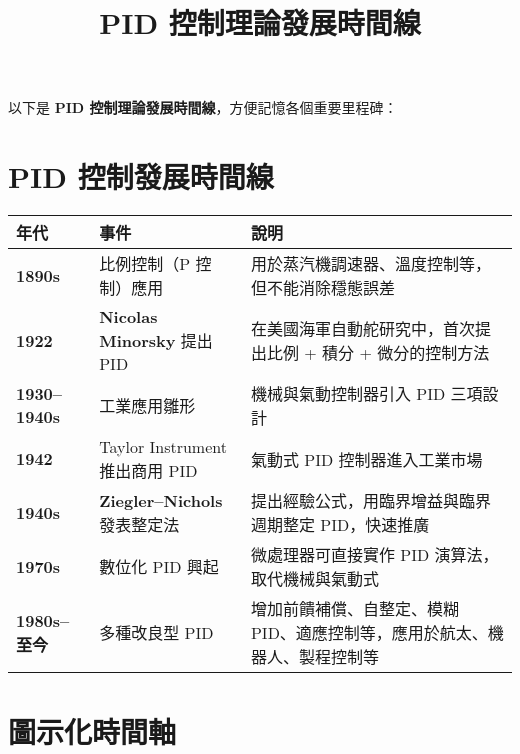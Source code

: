 \documentclass{article}
\title{PID 控制理論發展時間線}
\author{}
\date{}
\begin{document}
\maketitle

以下是 \textbf{PID 控制理論發展時間線}，方便記憶各個重要里程碑：

\section{PID 控制發展時間線}

\begin{longtable}{p{2cm} p{4cm} p{8cm}}
\toprule
\textbf{年代} & \textbf{事件} & \textbf{說明} \\
\midrule
\textbf{1890s} & 比例控制（P 控制）應用 & 用於蒸汽機調速器、溫度控制等，但不能消除穩態誤差 \\
\addlinespace
\textbf{1922} & \textbf{Nicolas Minorsky} 提出 PID & 在美國海軍自動舵研究中，首次提出比例 + 積分 + 微分的控制方法 \\
\addlinespace
\textbf{1930--1940s} & 工業應用雛形 & 機械與氣動控制器引入 PID 三項設計 \\
\addlinespace
\textbf{1942} & Taylor Instrument 推出商用 PID & 氣動式 PID 控制器進入工業市場 \\
\addlinespace
\textbf{1940s} & \textbf{Ziegler--Nichols} 發表整定法 & 提出經驗公式，用臨界增益與臨界週期整定 PID，快速推廣 \\
\addlinespace
\textbf{1970s} & 數位化 PID 興起 & 微處理器可直接實作 PID 演算法，取代機械與氣動式 \\
\addlinespace
\textbf{1980s--至今} & 多種改良型 PID & 增加前饋補償、自整定、模糊 PID、適應控制等，應用於航太、機器人、製程控制等 \\
\bottomrule
\end{longtable}

\section{圖示化時間軸}
\end{document}
